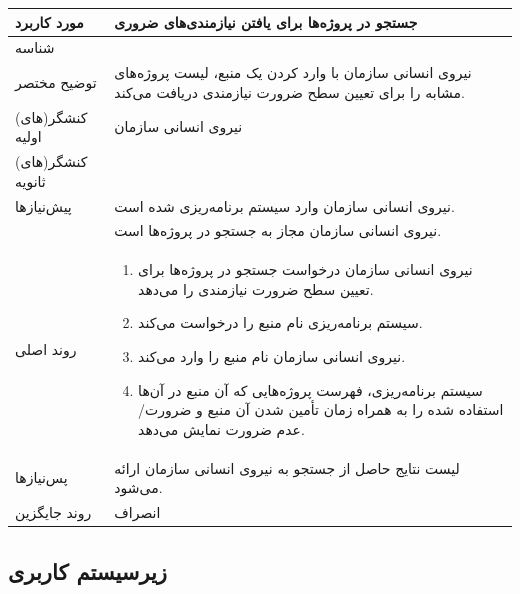 \begin{table}[H]
	\centering
	\begin{tabular}{|p{3cm}|p{10cm}|}
		\hline
		مورد کاربرد & جستجو در پروژه‌ها برای یافتن نیازمندی‌های ضروری  \\
		\hline
		شناسه & 
		\stepcounter{usecase_ID}
		\arabic{usecase_ID} \\
		\hline
		توضیح مختصر & نیروی انسانی سازمان با وارد کردن یک منبع، لیست پروژه‌های مشابه را برای تعیین سطح ضرورت نیازمندی دریافت می‌کند. \\
		\hline
		کنشگر(های) اولیه & نیروی انسانی سازمان \\
		\hline
		کنشگر(های) ثانویه &  \\
		\hline
		پیش‌نیازها & نیروی انسانی سازمان وارد سیستم برنامه‌ریزی شده است. \\
		& نیروی انسانی سازمان مجاز به جستجو در پروژه‌ها است. \\
		\hline
		
		روند اصلی &
		\begin{enumerate}[topsep=0cm,leftmargin=0.5cm]
			\item نیروی انسانی سازمان درخواست جستجو در پروژه‌ها برای تعیین سطح ضرورت نیازمندی را می‌دهد.
			\item سیستم برنامه‌ریزی نام منبع را درخواست می‌کند. 
			\item نیروی انسانی سازمان نام منبع را وارد می‌کند. 
			\item سیستم برنامه‌ریزی، فهرست پروژه‌هایی که آن منبع در آن‌ها استفاده شده را به همراه زمان تأمین شدن آن منبع و ضرورت/عدم ضرورت نمایش می‌دهد.
		\end{enumerate} \\
		
		\hline
		
		پس‌نیازها & لیست نتایج حاصل از جستجو به نیروی انسانی سازمان ارائه می‌شود. \\
		\hline
		روند جایگزین & انصراف \\
		\hline
	\end{tabular}
\end{table}

\subsection{زیرسیستم کاربری}

